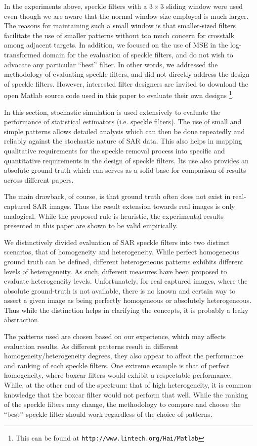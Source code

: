 In the experiments above, speckle filters with a $3 \times 3$ sliding window were used 
	even though we are aware that the normal window size employed is much larger. 
The reasons for maintaining such a small window is that 
	smaller-sized filters facilitate the use of smaller patterns without too much concern for crosstalk 
	among adjacent targets.
In addition, we focused on the use of MSE in the log-transformed domain for the evaluation of speckle filters, 
	and do not wish to advocate any particular ``best'' filter. 
In other words, we addressed the methodology of evaluating speckle filters, 
	and did not directly address the design of speckle filters.
However, interested filter designers are invited to download the open Matlab source code used in this paper 
to evaluate their own designs
  \footnote{This can be found at \texttt{http://www.lintech.org/Hai/Matlab}}.

In this section, stochastic simulation is used extensively to evaluate the performance of statistical estimators 
(i.e. speckle filters).
The use of small and simple patterns allows detailed analysis
  which can then be done repeatedly and reliably against the 
stochastic nature of SAR data.
This also helps in mapping qualitative requirements for the speckle removal process into specific and quantitative 
requirements in the design of speckle filters.
Its use also provides an absolute ground-truth which can serves as a solid base for comparison of results across different papers.

The main drawback, of course, is that ground truth often does not exist in real-captured SAR images.
Thus the result extension towards real images is only analogical.
While the proposed rule is heuristic, 
	the experimental results presented in this paper are shown to be valid empirically.

We distinctively divided evaluation of SAR speckle filters into two distinct scenarios, that of homogeneity and heterogeneity.
While perfect homogeneous ground truth can be defined, 
	different heterogeneous patterns exhibits different levels of heterogeneity. 
As such, different measures have been proposed to evaluate heterogeneity levels.
Unfortunately, for real captured images, where the absolute ground-truth is not available, 
	there is no known and certain way to assert a given image as being perfectly homogeneous or 
	absolutely heterogeneous.
Thus while the distinction helps in clarifying the concepts, 
	it is probably a leaky abstraction.

The patterns used are chosen based on our experience, which may affects evaluation results. 
As different patterns result in different homogeneity/heterogeneity degrees, 
	they also appear to affect the performance and ranking of each speckle filters.
One extreme example is that of perfect homogeneity, where boxcar filters would exhibit a respectable performance.
While, at the other end of the spectrum: that of high heterogeneity, it is common knowledge that the boxcar filter 
	would not perform that well.
While the ranking of the speckle filters may change, the methodology to compare and choose the ``best’’ speckle filter should work regardless of the choice of patterns.

